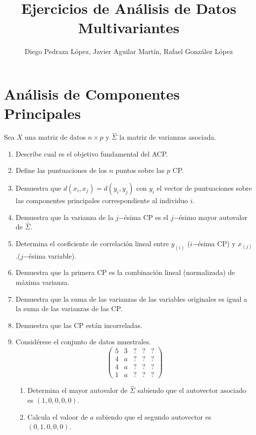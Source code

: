 \documentclass[twoside]{article}
\begin{document}
\title{Ejercicios de Análisis de Datos Multivariantes}
\author{Diego Pedraza López, Javier Aguilar Martín, Rafael González López}
\maketitle

\section{Análisis de Componentes Principales}
Sea $X$ una matriz de datos $n \times p$ y $\widehat{\Sigma}$ la matriz de varianzas asociada.

\begin{enumerate}
\item Describe cual es el objetivo fundamental del ACP. 
\item Define las puntuaciones de los $n$ puntos sobre las $p$ CP. 
\item Demuestra que $d(x_i, x_j) = d(y_i, y_j)$ con $y_i$ el vector de puntuaciones sobre las componentes principales correspondiente al individuo $i$. 
\item Demuestra que la varianza de la $j$−ésima CP es el $j$−ésimo mayor autovalor de $\widehat{\Sigma}$.
\item Determina el coeficiente de correlación lineal entre $y_{(i)}$ ($i$−ésima CP) y $x_{(j)}$ .($j$−ésima variable). 
\item Demuestra que la primera CP es la combinación lineal (normalizada) de máxima varianza. 
\item Demuestra que la suma de las varianzas de las variables originales es igual a la suma de las varianzas de las CP.
\item Demuestra que las CP están incorreladas.
\item Considérese el conjunto de datos muestrales.
\[ \begin{pmatrix}5 & 3 & ? & ? & ?\\4 & a & ? & ? & ?\\4 & a & ? & ? & ?\\1 & a & ? & ? & ?\end{pmatrix}\]
\begin{enumerate}
	\item Determina el mayor autovalor de $\widehat{\Sigma}$ sabiendo que el autovector asociado es $(1,0,0,0,0)$.
	\item Calcula el valoor de $a$ sabiendo que el segundo autovector es $(0,1,0,0,0)$.
\end{enumerate}
\end{enumerate}
\end{document}
